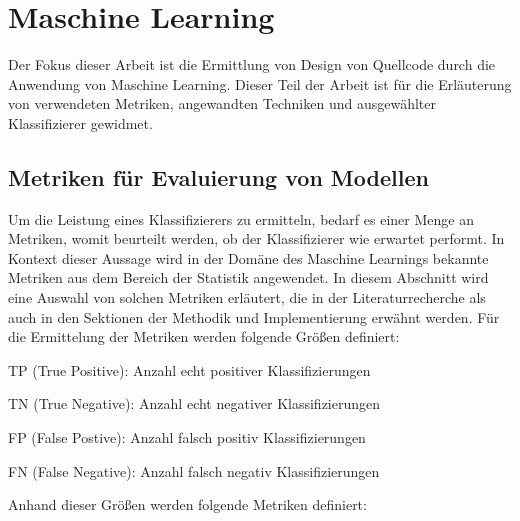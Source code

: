 \section{Maschine Learning}

Der Fokus dieser Arbeit ist die Ermittlung von Design von Quellcode durch die Anwendung von Maschine Learning.
Dieser Teil der Arbeit ist für die Erläuterung von verwendeten Metriken, angewandten Techniken und ausgewählter Klassifizierer gewidmet.

\subsection{Metriken für Evaluierung von Modellen}\label{metrics}

Um die Leistung eines Klassifizierers zu ermitteln, bedarf es einer Menge an Metriken, womit beurteilt werden, ob der Klassifizierer wie erwartet performt.
In Kontext dieser Aussage wird in der Domäne des Maschine Learnings bekannte Metriken aus dem Bereich der Statistik angewendet.
In diesem Abschnitt wird eine Auswahl von solchen Metriken erläutert, die in der Literaturrecherche als auch in den Sektionen der Methodik und Implementierung erwähnt werden.
Für die Ermittelung der Metriken werden folgende Größen definiert:

\begin{description}
    \item TP (True Positive): Anzahl echt positiver Klassifizierungen
    \item TN (True Negative): Anzahl echt negativer Klassifizierungen
    \item FP (False Postive): Anzahl falsch positiv Klassifizierungen
    \item FN (False Negative): Anzahl falsch negativ Klassifizierungen
\end{description}

Anhand dieser Größen werden folgende Metriken definiert:

